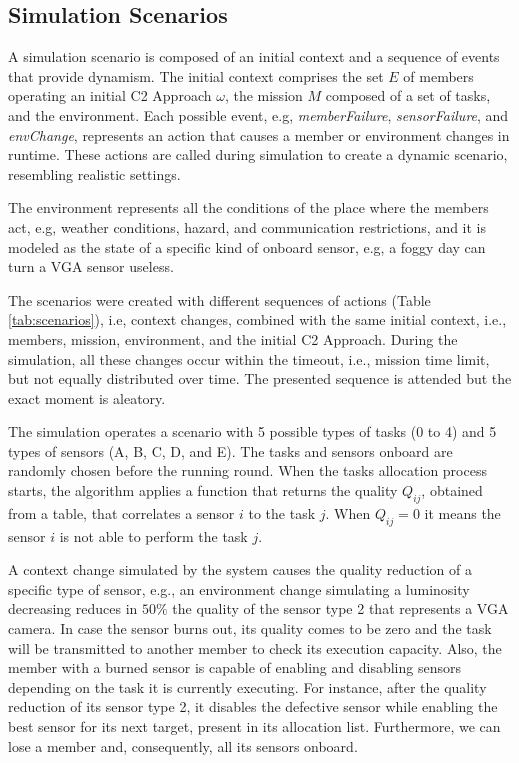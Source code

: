 \subsection{Simulation Scenarios}
\label{sub:scenarios}

A simulation scenario is composed of an initial context and a sequence of events that provide dynamism. The initial context comprises the set $E$ of members operating an initial C2 Approach $\omega$, the mission $M$ composed of a set of tasks, and the environment. Each possible event, e.g, \textit{memberFailure}, \textit{sensorFailure}, and \textit{envChange}, represents an action that causes a member or environment changes in runtime. These actions are called during simulation to create a dynamic scenario, resembling realistic settings.

The environment represents all the conditions of the place where the members act, e.g, weather conditions, hazard, and communication restrictions, and it is modeled as the state of a specific kind of onboard sensor, e.g, a foggy day can turn a VGA sensor useless.

The scenarios were created with different sequences of actions (Table \ref{tab:scenarios}), i.e, context changes, combined with the same initial context, i.e., members, mission, environment, and the initial C2 Approach. During the simulation, all these changes occur within the timeout, i.e., mission time limit, but not equally distributed over time. The presented sequence is attended but the exact moment is aleatory.



The simulation operates a scenario with 5 possible types of tasks (0 to 4) and 5 types of sensors (A, B, C, D, and E). The tasks and sensors onboard are randomly chosen before the running round. When the tasks allocation process starts, the algorithm applies a function that returns the quality $Q_{ij}$, obtained from a table, that correlates a sensor $i$ to the task $j$. When $Q_{ij}=0$ it means the sensor $i$ is not able to perform the task $j$.

A context change simulated by the system causes the quality reduction of a specific type of sensor, e.g., an environment change simulating a luminosity decreasing reduces in $50\%$ the quality of the sensor type 2 that represents a VGA camera. In case the sensor burns out, its quality comes to be zero and the task will be transmitted to another member to check its execution capacity. Also, the member with a burned sensor is capable of enabling and disabling sensors depending on the task it is currently executing. For instance, after the quality reduction of its sensor type 2, it disables the defective sensor while enabling the best sensor for its next target, present in its allocation list. Furthermore, we can lose a member and, consequently, all its sensors onboard.

